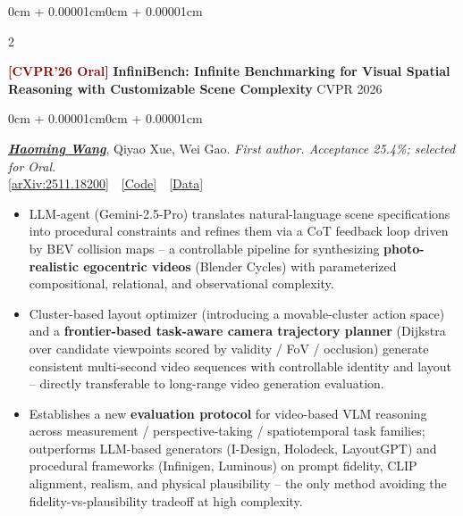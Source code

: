 \documentclass[10pt, letterpaper]{article}
\newenvironment{highlights}{
    \begin{itemize}[topsep=0.08cm,parsep=0.08cm,partopsep=0pt,itemsep=0pt,leftmargin=0cm + 10pt]
}{\end{itemize}}
\newenvironment{onecolentry}{
    \begin{adjustwidth}{0cm + 0.00001cm}{0cm + 0.00001cm}
}{\end{adjustwidth}}
\newenvironment{twocolentry}[2][]{
    \onecolentry
    \def\secondColumn{#2}
    \setcolumnwidth{\fill, 4.5cm}
    \begin{paracol}{2}
}{\switchcolumn \raggedleft \secondColumn \end{paracol} \endonecolentry}
\let\hrefWithoutArrow\href
\begin{document}
\begin{twocolentry}{CVPR 2026}
    \textcolor{darkred}{\textbf{[CVPR'26 Oral]}} \textbf{InfiniBench: Infinite Benchmarking for Visual Spatial Reasoning with Customizable Scene Complexity}
\end{twocolentry}
\vspace{0.06cm}
\begin{onecolentry}
\underline{\textbf{\textit{Haoming Wang}}}, Qiyao Xue, Wei Gao. \textit{First author. Acceptance 25.4\%; selected for Oral.}\\
\hrefWithoutArrow{https://arxiv.org/abs/2511.18200}{[arXiv:2511.18200]} \,\,
\hrefWithoutArrow{https://github.com/pittisl/infinibench}{[Code]} \,\,
\hrefWithoutArrow{https://huggingface.co/datasets/Haoming645/infinibench}{[Data]}
\begin{highlights}
    \item LLM-agent (Gemini-2.5-Pro) translates natural-language scene specifications into procedural constraints and refines them via a CoT feedback loop driven by BEV collision maps -- a controllable pipeline for synthesizing \textbf{photo-realistic egocentric videos} (Blender Cycles) with parameterized compositional, relational, and observational complexity.
    \item Cluster-based layout optimizer (introducing a movable-cluster action space) and a \textbf{frontier-based task-aware camera trajectory planner} (Dijkstra over candidate viewpoints scored by validity / FoV / occlusion) generate consistent multi-second video sequences with controllable identity and layout -- directly transferable to long-range video generation evaluation.
    \item Establishes a new \textbf{evaluation protocol} for video-based VLM reasoning across measurement / perspective-taking / spatiotemporal task families; outperforms LLM-based generators (I-Design, Holodeck, LayoutGPT) and procedural frameworks (Infinigen, Luminous) on prompt fidelity, CLIP alignment, realism, and physical plausibility -- the only method avoiding the fidelity-vs-plausibility tradeoff at high complexity.
\end{highlights}
\end{onecolentry}

\vspace{0.22cm}
\end{document}
